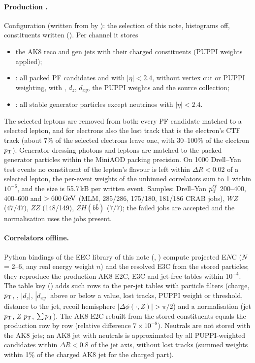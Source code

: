 \paragraph{Production .} Configuration  (written from  by
): the selection of this note, histograms off, constituents written
(). Per channel it stores
\begin{itemize}
\item the AK8 reco and gen jets with their charged constituents (PUPPI weights applied);
\item {}: all packed PF candidates and  with $|\eta| < 2.4$, without vertex cut or
  PUPPI weighting, with , $d_z$, $d_{xy}$, the PUPPI weights and the source collection;
\item {}: all stable generator particles except neutrinos with $|\eta| < 2.4$.
\end{itemize}
The selected leptons are removed from both: every PF candidate matched to a selected lepton, and for electrons also the
lost track that is the electron's CTF track (about 7\% of the selected electrons leave one, with 30--100\% of the
electron $p_{\mathrm{T}}$). Generator dressing photons and leptons are matched to the packed generator particles within the
MiniAOD packing precision. On 1000 Drell--Yan test events no constituent of the lepton's flavour is left within
$\Delta R < 0.02$ of a selected lepton, the per-event weights of the unbinned correlators sum to 1 within $10^{-6}$, and
the size is 55.7\,kB per written event. Samples: Drell--Yan $p_{\mathrm{T}}^{\ell\ell}$ 200--400, 400--600 and $> 600\,\mathrm{GeV}$ (MLM, 285/286,
175/180, 181/186 CRAB jobs), $WZ$ (47/47), $ZZ$ (148/149), $ZH(b\bar b)$ (7/7); the failed jobs are accepted and the
normalisation uses the jobs present.

\paragraph{Correlators offline.} Python bindings of the EEC library of this note (,
) compute projected E$N$C ($N$ = 2--6, any real energy weight $n$) and the resolved E3C from the
stored particles; they reproduce the production AK8 E2C, E3C and jet-free tables within $10^{-4}$. The table key
 () adds such rows to the per-jet tables with particle filters (charge, $p_{\mathrm{T}}$,
, $|d_z|$, $|d_{xy}|$ above or below a value, lost tracks, PUPPI weight or threshold, distance to the jet,
recoil hemisphere $|\Delta\phi(\cdot, Z)| > \pi/2$) and a normalisation (jet $p_{\mathrm{T}}$, $Z$ $p_{\mathrm{T}}$, $\sum p_{\mathrm{T}}$). The AK8 E2C
rebuilt from the stored constituents equals the production row by row (relative difference $7\times10^{-8}$). Neutrals
are not stored with the AK8 jets; an AK8 jet with neutrals is approximated by all PUPPI-weighted candidates within
$\Delta R < 0.8$ of the jet axis, without lost tracks (summed weights within 1\% of the charged AK8 jet for the charged
part).

